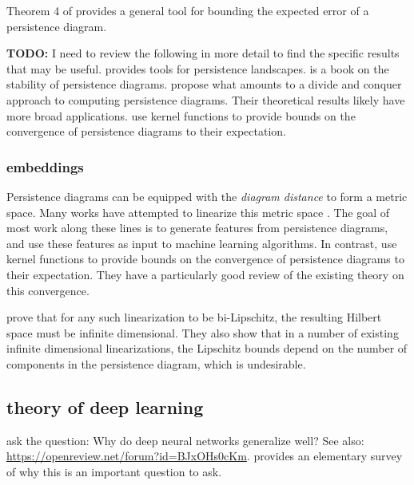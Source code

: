 \documentclass{article}
\newcommand{\defn}[1]{\textit{#1}}
\newcommand{\todo}[1]{{\textbf{TODO:} {#1}}}
\begin{document}
Theorem 4 of \citet{chazal2015convergence} provides a general tool for bounding the expected error of a persistence diagram.

\todo{I need to review the following in more detail to find the specific results that may be useful.}
\citet{chazal2014stochastic} provides tools for persistence landscapes.
\citet{chazal2012structure} is a book on the stability of persistence diagrams.
\citet{chazal2015subsampling} propose what amounts to a divide and conquer approach to computing persistence diagrams.
Their theoretical results likely have more broad applications.
\citet{chazal2018density} use kernel functions to provide bounds on the convergence of persistence diagrams to their expectation.

\subsubsection{embeddings}

Persistence diagrams can be equipped with the \defn{diagram distance} to form a metric space.
Many works have attempted to linearize this metric space \citep[e.g.][]{zielinski2018persistence,le2018persistence,hofer2017deep,kusano2016persistence,carriere2017sliced,cang2017topologynet,anirudh2016riemannian,obayashi2018persistence,adams2017persistence,kwitt2015statistical}.
The goal of most work along these lines is to generate features from persistence diagrams,
and use these features as input to machine learning algorithms.
In contrast, \citet{chazal2018density} use kernel functions to provide bounds on the convergence of persistence diagrams to their expectation.
They have a particularly good review of the existing theory on this convergence.

\citet{carriere2018metric} prove that for any such linearization to be bi-Lipschitz, 
the resulting Hilbert space must be infinite dimensional.
They also show that in a number of existing infinite dimensional linearizations,
the Lipschitz bounds depend on the number of components in the persistence diagram,
which is undesirable.

\subsection{theory of deep learning}

\citet{zhang2016understanding,neyshabur2017exploring} ask the question: 
Why do deep neural networks generalize well?
See also: \url{https://openreview.net/forum?id=BJxOHs0cKm}.
\citet{jakubovitz2018generalization} provides an elementary survey of why this is an important question to ask.
\end{document}
